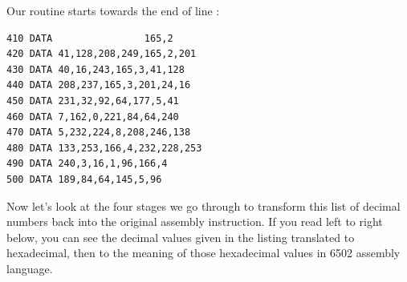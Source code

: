 Our  routine starts towards the end of line :
\begin{lstlisting}[escapechar=\%]
410 DATA                165,2
420 DATA 41,128,208,249,165,2,201
430 DATA 40,16,243,165,3,41,128
440 DATA 208,237,165,3,201,24,16
450 DATA 231,32,92,64,177,5,41
460 DATA 7,162,0,221,84,64,240
470 DATA 5,232,224,8,208,246,138
480 DATA 133,253,166,4,232,228,253
490 DATA 240,3,16,1,96,166,4
500 DATA 189,84,64,145,5,96   
\end{lstlisting}

Now let's look at the four stages we go through to transform this list of decimal numbers back into the original
assembly instruction. If you read left to right below, you can see the decimal values given in the listing translated to
hexadecimal, then to the meaning of those hexadecimal values in 6502 assembly language.

